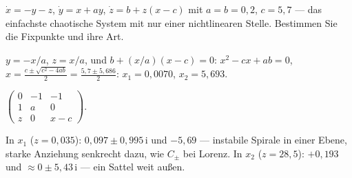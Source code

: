 \begin{aufgabe}
$\dot x = -y - z$, $\dot y = x + ay$, $\dot z = b + z(x - c)$ mit $a = b = 0{,}2$, $c = 5{,}7$ --- das einfachste chaotische System mit nur einer nichtlinearen Stelle. Bestimmen Sie die Fixpunkte und ihre Art.

\loesung
{}
$y = -x/a$, $z = x/a$, und $b + (x/a)(x - c) = 0$: $x^{2} - cx + ab = 0$, $x = \frac{c \pm \sqrt{c^{2} - 4ab}}{2} = \frac{5{,}7 \pm 5{,}686}{2}$: $x_1 = 0{,}0070$, $x_2 = 5{,}693$.

$\begin{pmatrix}0&-1&-1\\1&a&0\\z&0&x-c\end{pmatrix}$.

In $x_1$ ($z = 0{,}035$): $0{,}097 \pm 0{,}995\,\mathrm i$ und $-5{,}69$ --- instabile Spirale in einer Ebene, starke Anziehung senkrecht dazu, wie $C_\pm$ bei Lorenz. In $x_2$ ($z = 28{,}5$): $+0{,}193$ und $\approx 0 \pm 5{,}43\,\mathrm i$ --- ein Sattel weit außen.

\begin{center}
\begin{minipage}{0.88\textwidth}
\end{minipage}
\end{center}
\end{aufgabe}

